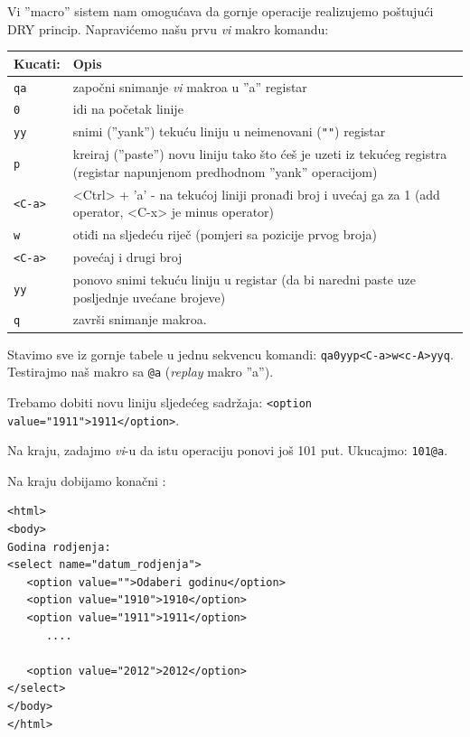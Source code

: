 \documentclass[times, utf8, seminar]{fit}
\begin{document}
Vi ''macro'' sistem nam omogućava da gornje operacije realizujemo poštujući DRY princip. Napravićemo našu prvu \emph{vi} makro komandu:
\begin{center}
\begin{tabular}{ |p{4cm}|p{10cm}| }
  \hline                        
   Kucati:    &  Opis \\ 
   \hline
   \verb+qa+     & započni snimanje \emph{vi} makroa u ''a'' registar \\
   \verb+0+      & idi na početak linije \\
   \verb+yy+     & snimi (''yank'') tekuću liniju u neimenovani (\verb+""+) registar \\
   \verb+p+      & kreiraj (''paste'') novu liniju tako što ćeš je uzeti iz tekućeg registra (registar napunjenom predhodnom ''yank'' operacijom) \\
   \verb+<C-a>+  & <Ctrl> + 'a' - na tekućoj liniji pronađi broj i uvećaj ga za 1 (add operator, <C-x> je minus operator) \\
   \verb+w+      & otiđi na sljedeću riječ (pomjeri sa pozicije prvog broja) \\
   \verb+<C-a>+  & povećaj i drugi broj \\
   \verb+yy+     & ponovo snimi tekuću liniju u registar (da bi naredni paste uze posljednje uvećane brojeve) \\
   \verb+q+      & završi snimanje makroa.\\
   \hline
\end{tabular}
\end{center}

Stavimo sve iz gornje tabele u jednu sekvencu komandi: \verb+qa0yyp<C-a>w<c-A>yyq+. \newline Testirajmo naš makro sa \verb+@a+ (\emph{replay} makro ''a''). 

Trebamo dobiti novu liniju sljedećeg sadržaja: \verb+<option value="1911">1911</option>+. 

Na kraju, zadajmo \emph{vi}-u da istu operaciju ponovi još 101 put. Ukucajmo: \verb+101@a+. 

Na kraju dobijamo konačni \href{https://gist.github.com/4412263}{\color{blue}{rezultat}}:

\begin{lstlisting}
<html>
<body>
Godina rodjenja:
<select name="datum_rodjenja">
   <option value="">Odaberi godinu</option>
   <option value="1910">1910</option>
   <option value="1911">1911</option>
      ....

   <option value="2012">2012</option>
</select>
</body>
</html>
\end{lstlisting}
\end{document}
